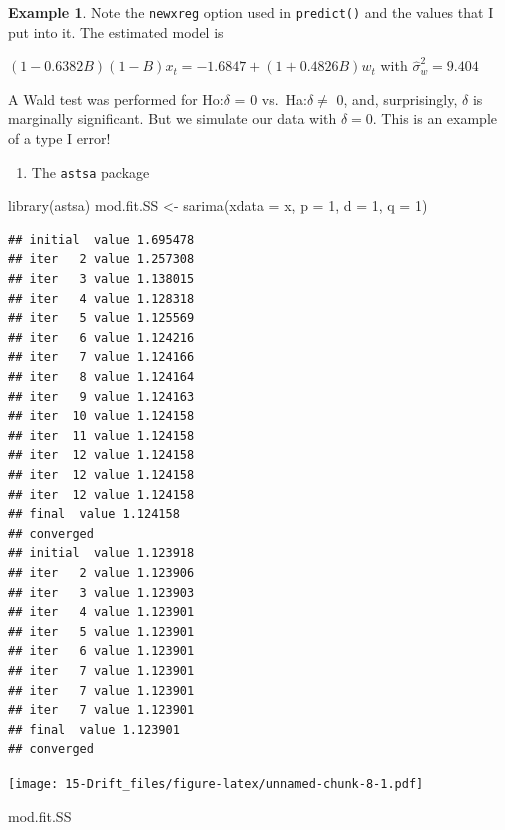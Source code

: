 \documentclass[
]{book}
\newenvironment{Shaded}{\begin{snugshade}}{\end{snugshade}}
\newcommand{\AttributeTok}[1]{\textcolor[rgb]{0.77,0.63,0.00}{#1}}
\newcommand{\DecValTok}[1]{\textcolor[rgb]{0.00,0.00,0.81}{#1}}
\newcommand{\FunctionTok}[1]{\textcolor[rgb]{0.00,0.00,0.00}{#1}}
\newcommand{\NormalTok}[1]{#1}
\newcommand{\OtherTok}[1]{\textcolor[rgb]{0.56,0.35,0.01}{#1}}
\providecommand{\tightlist}{%
  \setlength{\itemsep}{0pt}\setlength{\parskip}{0pt}}
\theoremstyle{definition}
\theoremstyle{definition}
\newtheorem{example}{Example}[chapter]
\theoremstyle{definition}
\theoremstyle{definition}
\theoremstyle{remark}
\begin{document}
\begin{example}
Note the \texttt{newxreg} option used in \texttt{predict()} and the values that I put into it. The estimated model is

\((1 - 0.6382B)(1 - B)x_t = -1.6847 + (1 + 0.4826B)w_t\) with \(\hat \sigma_w^2=9.404\)

A Wald test was performed for Ho:\(\delta\) = 0 vs.~Ha:\(\delta \ne\) 0, and, surprisingly, \(\delta\) is marginally significant. But we simulate our data with \(\delta=0\). This is an example of a type I error!

\begin{enumerate}
\def\labelenumi{\arabic{enumi}.}
\setcounter{enumi}{1}
\tightlist
\item
  The \texttt{astsa} package
\end{enumerate}

\begin{Shaded}
\begin{Highlighting}[]
\FunctionTok{library}\NormalTok{(astsa)}
\NormalTok{mod.fit.SS }\OtherTok{\textless{}{-}} \FunctionTok{sarima}\NormalTok{(}\AttributeTok{xdata =}\NormalTok{ x, }\AttributeTok{p =} \DecValTok{1}\NormalTok{, }\AttributeTok{d =} \DecValTok{1}\NormalTok{, }\AttributeTok{q =} \DecValTok{1}\NormalTok{)}
\end{Highlighting}
\end{Shaded}

\begin{verbatim}
## initial  value 1.695478 
## iter   2 value 1.257308
## iter   3 value 1.138015
## iter   4 value 1.128318
## iter   5 value 1.125569
## iter   6 value 1.124216
## iter   7 value 1.124166
## iter   8 value 1.124164
## iter   9 value 1.124163
## iter  10 value 1.124158
## iter  11 value 1.124158
## iter  12 value 1.124158
## iter  12 value 1.124158
## iter  12 value 1.124158
## final  value 1.124158 
## converged
## initial  value 1.123918 
## iter   2 value 1.123906
## iter   3 value 1.123903
## iter   4 value 1.123901
## iter   5 value 1.123901
## iter   6 value 1.123901
## iter   7 value 1.123901
## iter   7 value 1.123901
## iter   7 value 1.123901
## final  value 1.123901 
## converged
\end{verbatim}

\texttt{[image: 15-Drift\_files/figure-latex/unnamed-chunk-8-1.pdf]}

\begin{Shaded}
\begin{Highlighting}[]
\NormalTok{mod.fit.SS}
\end{Highlighting}
\end{Shaded}


\end{example}
\end{document}
